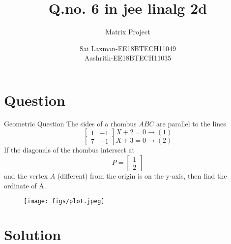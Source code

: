 \documentclass{beamer}
\title[Laxman&,Aashrith]{Q.no. 6 in jee linalg 2d}
\subtitle{Matrix Project}
\author{Sai Laxman-EE18BTECH11049\\Aashrith-EE18BTECH11035}
\begin{document}
\begin{frame}
\titlepage    
\end{frame}

\section{Question}
\begin{frame}{Geometric Question}
The sides of a rhombus $ABC$ are parallel to the
lines
$$
\begin{bmatrix}
1 & -1
\end{bmatrix}
X+2=0\longrightarrow (1)$$
$$
\begin{bmatrix}
7 & -1
\end{bmatrix}
X+3=0\longrightarrow (2)$$
If the diagonals of the rhombus intersect at
$$P=
\begin{bmatrix}
1 \\
2
\end{bmatrix}
$$
and the vertex $A$ (different) from the origin is
on the y-axis, then find the ordinate of A.
\end{frame}
\begin{frame}
\begin{figure}
    \texttt{[image: figs/plot.jpeg]}
\end{figure}
\end{frame}
\section{Solution}
\end{document}
